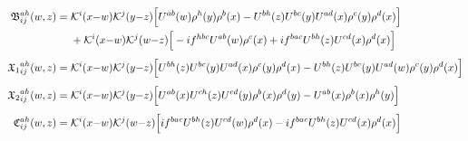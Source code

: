 \begin{align}
\mathfrak B^{ah}_{ij}(w,z)=\;&\mathcal{K}^{i}(x{-}w)\mathcal{K}^{j}(y{-}z)\Big[U^{ab}(w)\rho^{h}(y)\rho^{b}(x)-U^{bh}(z)U^{bc}(y)U^{ad}(x)\rho^{c}(y)\rho^{d}(x)\Big]\notag\\
&+\mathcal{K}^{i}(x{-}w)\mathcal{K}^{j}(w{-}z)\Big[-if^{hbc}U^{ab}(w)\rho^{c}(x)+if^{bac}U^{bh}(z)U^{cd}(x)\rho^{d}(x)\Big]\label{eq:LLT2TB}
\\[4pt]
{\mathfrak X_1}^{ah}_{ij}(w,z)=\;&\mathcal{K}^{i}(x{-}w)\mathcal{K}^{j}(y{-}z)\Big[U^{bh}(z)U^{bc}(y)U^{ad}(x)\rho^{c}(y)\rho^{d}(x)-U^{bh}(z)U^{bc}(y)U^{ad}(w)\rho^{c}(y)\rho^{d}(x)\Big]\label{eq:LLT2TX1}
\\[4pt]
{\mathfrak X_2}^{ah}_{ij}(w,z)=\;&\mathcal{K}^{i}(x{-}w)\mathcal{K}^{j}(y{-}z)\Big[U^{ab}(x)U^{ch}(z)U^{cd}(y)\rho^{b}(x)\rho^{d}(y)-U^{ab}(x)\rho^{b}(x)\rho^{h}(y)\Big]\label{eq:LLT2TX2}
\\[4pt]
\mathfrak C^{ah}_{ij}(w,z)=\;&\mathcal{K}^{i}(x{-}w)\mathcal{K}^{j}(w{-}z)\Big[if^{bac}U^{bh}(z)U^{cd}(w)\rho^{d}(x)-if^{bac}U^{bh}(z)U^{cd}(x)\rho^{d}(x)\Big]\label{eq:LLT2TC}
\end{align}
